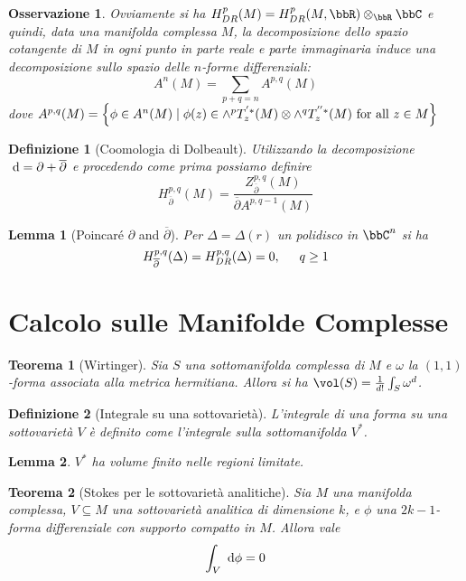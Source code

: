 \documentclass[a4paper,11pt]{article}
\newtheorem{teorema}{Teorema}
\newtheorem{lemma}{Lemma}
\newtheorem{definizione}{Definizione}
\newtheorem{osservazione}{Osservazione}
\begin{document}
\begin{osservazione}
  Ovviamente si ha $H^p_{DR}(M) = H^p_{DR}(M, \bbR) \otimes_\bbR \bbC$ e quindi, data una manifolda complessa $M$, la decomposizione dello spazio cotangente di $M$ in ogni punto in parte reale e parte immaginaria induce una decomposizione sullo spazio delle $n$-forme differenziali:
  $$ A^n(M) = \sum_{p + q = n} A^{p, q}(M) $$
  dove $A^{p, q}(M) = \left\{{\phi \in A^n(M) \mid \phi(z) \in \wedge^p T_z^{'*} (M) \otimes \wedge^q T_z^{''*} (M) \text{ for all } z \in M}\right\}$
\end{osservazione}

\begin{definizione}[Coomologia di Dolbeault]
  Utilizzando la decomposizione $\de = \partial + \overline\partial$ e procedendo come prima possiamo definire
  $$ H_{\overline\partial}^{p, q}(M) = \frac{Z^{p, q}_{\overline\partial}(M)}{\overline\partial A^{p, q-1}(M)} $$
\end{definizione}

\begin{lemma}[Poincaré $\partial$ and $\overline\partial$]
  Per $\Delta = \Delta(r)$ un polidisco in $\bbC^n$ si ha
  $$ H^{p, q}_{\overline\partial}(\Delta) = H^{p, q}_{DR}(\Delta) = 0, \hskip 1.5em q \ge 1 $$
\end{lemma}

\section{Calcolo sulle Manifolde Complesse}

\begin{teorema}[Wirtinger]
  Sia $S$ una sottomanifolda complessa di $M$ e $\omega$ la $(1, 1)$-forma associata alla metrica hermitiana.
  Allora si ha $\vol(S) = \frac{1}{d!} \int_S \omega^d$.
\end{teorema}

\begin{definizione}[Integrale su una sottovarietà]
  L'integrale di una forma su una sottovarietà $V$ è definito come l'integrale sulla sottomanifolda $V^*$.
\end{definizione}

\begin{lemma}
  $V^*$ ha volume finito nelle regioni limitate.
\end{lemma}

\begin{teorema}[Stokes per le sottovarietà analitiche]
  Sia $M$ una manifolda complessa, $V \subseteq M$ una sottovarietà analitica di dimensione $k$, e $\phi$ una $2k-1$-forma differenziale con supporto compatto in $M$. Allora vale
  $$ \int_V \de \phi = 0 $$
\end{teorema}
\end{document}

